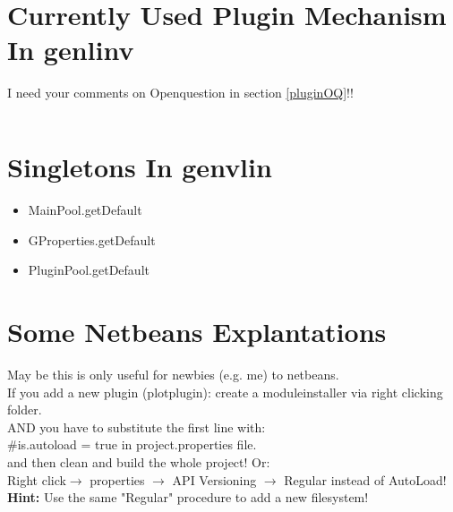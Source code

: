 \documentclass[12pt]{article}
\begin{document}
\section{Currently Used Plugin Mechanism In genlinv}
I need your comments on Openquestion in section \ref{pluginOQ}!!
\begin{verbatim}
\end{verbatim}
\section{Singletons In genvlin}
\begin{itemize}
\item MainPool.getDefault
\item GProperties.getDefault
\item PluginPool.getDefault
\end{itemize}
\section{Some Netbeans Explantations}
May be this is only useful for newbies (e.g. me) to netbeans.\\
If you add a new plugin (plotplugin): create a moduleinstaller via right clicking folder.\\
AND you have to substitute the first line with:\\
\#is.autoload = true in project.properties file.\\
and then clean and build the whole project! Or:\\
Right click$\rightarrow$ properties $\rightarrow$ API Versioning $\rightarrow$ Regular instead of AutoLoad!
{\bf Hint:} Use the same "Regular" procedure to add a new filesystem!
\end{document}
